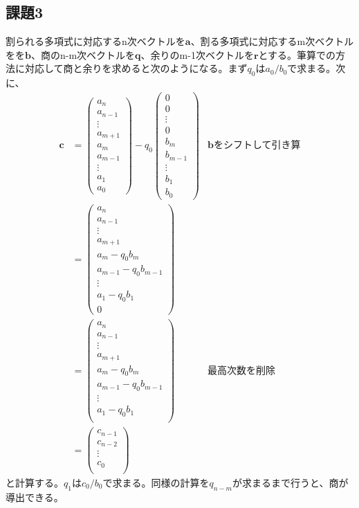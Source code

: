 \documentclass{jsarticle}
\begin{document}
\subsection{課題3}
割られる多項式に対応するn次ベクトルを$\bm{a}$、割る多項式に対応するm次ベクトルをを$\bm{b}$、商のn-m次ベクトルを$\bm{q}$、余りのm-1次ベクトルを$\bm{r}$とする。筆算での方法に対応して商と余りを求めると次のようになる。まず$q_0$は$a_0 / b_0$で求まる。次に、
\begin{align}
\bm{c} &=
\begin{pmatrix}
	a_n \\
	a_{n-1} \\
	\vdots \\
	a_{m+1} \\
	a_m \\
	a_{m-1} \\
	\vdots \\
	a_1 \\
	a_0
\end{pmatrix} - q_0
\begin{pmatrix}
	0 \\
	0 \\
	\vdots \\
	0 \\
	b_m \\
	b_{m-1} \\
	\vdots \\
	b_1 \\
	b_0
\end{pmatrix} & \text{$\bm{b}$をシフトして引き算}\\
&=
\begin{pmatrix}
	a_n \\
	a_{n-1} \\
	\vdots \\
	a_{m+1} \\
	a_m - q_0 b_m \\
	a_{m-1} - q_0 b_{m-1} \\
	\vdots \\
	a_1 - q_0b_1 \\
	0
\end{pmatrix} \\
&= 
\begin{pmatrix}
	a_n \\
	a_{n-1} \\
	\vdots \\
	a_{m+1} \\
	a_m - q_0 b_m \\
	a_{m-1} - q_0 b_{m-1} \\
	\vdots \\
	a_1 - q_0b_1 \\
\end{pmatrix} & \text{最高次数を削除} \\
&=
\begin{pmatrix}
	c_{n-1} \\
	c_{n-2} \\
	\vdots \\
	c_0 \\
\end{pmatrix}
\end{align}
と計算する。$q_1$は$c_0/b_0$で求まる。同様の計算を$q_{n-m}$が求まるまで行うと、商が導出できる。
\end{document}
